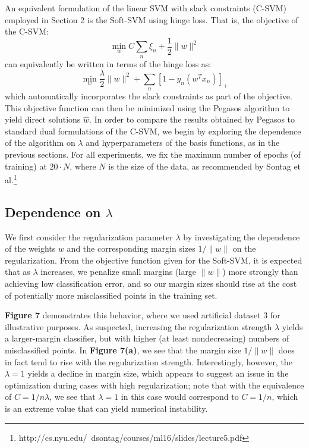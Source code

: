 \documentclass[10pt,psamsfonts]{amsart}
\theoremstyle{definition}
\theoremstyle{remark}
\numberwithin{equation}{section}
\begin{document}
An equivalent formulation of the linear SVM with slack constraints (C-SVM) employed in Section 2 is the Soft-SVM using hinge loss. That is, the objective of the C-SVM:
$$\min_w C \sum_n \xi_n+ \frac{1}{2}\|w\|^2$$
can equivalently be written in terms of the hinge loss as:
$$\min_w \frac{\lambda}{2} \|w\|^2  + \sum_n [1-y_n(w^Tx_n)]_+$$
which automatically incorporates the slack constraints as part of the objective. This objective function can then be minimized using the Pegasos algorithm to yield direct solutions $\hat{w}$. In order to compare the results obtained by Pegasos to standard dual formulations of the C-SVM, we begin by exploring the dependence of the algorithm on $\lambda$ and hyperparameters of the basis functions, as in the previous sections. For all experiments, we fix the maximum number of epochs (of training) at $20 \cdot N$, where $N$ is the size of the data, as recommended by Sontag et al.\footnote{http://cs.nyu.edu/~dsontag/courses/ml16/slides/lecture5.pdf}

\subsection{Dependence on $\lambda$} We first consider the regularization parameter $\lambda$ by investigating the dependence of the weights $w$ and the corresponding margin sizes $1/\|w\|$ on the regularization. From the objective function given for the Soft-SVM, it is expected that as $\lambda$ increases, we penalize small margins (large $\|w\|$) more strongly than achieving low classification error, and so our margin sizes should rise at the cost of potentially more misclassified points in the training set.

{\bf Figure 7} demonstrates this behavior, where we used artificial dataset 3 for illustrative purposes. As suspected, increasing the regularization strength $\lambda$ yields a larger-margin classifier, but with higher (at least nondecreasing) numbers of misclassified points. In {\bf Figure 7(a)}, we see that the margin size $1/\|w\|$ does in fact tend to rise with the regularization strength. Interestingly, however, the $\lambda = 1$ yields a decline in margin size, which appears to suggest an issue in the optimization during cases with high regularization; note that with the equivalence of $C = 1/n\lambda$, we see that $\lambda = 1$ in this case would correspond to $C = 1/n$, which is an extreme value that can yield numerical instability.
\end{document}
